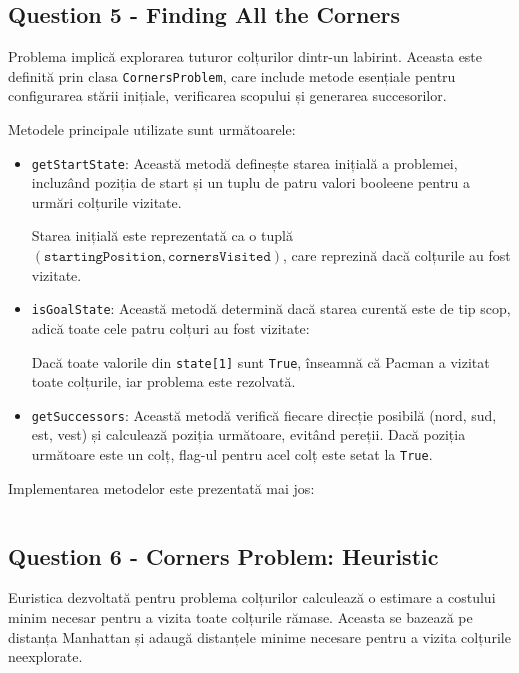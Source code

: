 \subsection{Question 5 - Finding All the Corners}
\par Problema implică explorarea tuturor colțurilor dintr-un labirint. Aceasta este definită prin clasa \texttt{CornersProblem}, care include metode esențiale pentru configurarea stării inițiale, verificarea scopului și generarea succesorilor.

\par Metodele principale utilizate sunt următoarele:

\begin{itemize}
	\item \texttt{getStartState}: Această metodă definește starea inițială a problemei, incluzând poziția de start și un tuplu de patru valori booleene pentru a urmări colțurile vizitate.
	\par Starea inițială este reprezentată ca o tuplă \((\texttt{startingPosition}, \texttt{cornersVisited})\), care reprezină dacă colțurile au fost vizitate.
	\item \texttt{isGoalState}: Această metodă determină dacă starea curentă este de tip scop, adică toate cele patru colțuri au fost vizitate:
	\par Dacă toate valorile din \texttt{state[1]} sunt \texttt{True}, înseamnă că Pacman a vizitat toate colțurile, iar problema este rezolvată.
	\item \texttt{getSuccessors}: Această metodă verifică fiecare direcție posibilă (nord, sud, est, vest) și calculează poziția următoare, evitând pereții. Dacă poziția următoare este un colț, flag-ul pentru acel colț este setat la \texttt{True}.
\end{itemize}

\par Implementarea metodelor este prezentată mai jos:
\inputminted[linenos]{python}{code/finding_all_corners.py}

\subsection{Question 6 - Corners Problem: Heuristic}
\par Euristica dezvoltată pentru problema colțurilor calculează o estimare a costului minim necesar pentru a vizita toate colțurile rămase. Aceasta se bazează pe distanța Manhattan și adaugă distanțele minime necesare pentru a vizita colțurile neexplorate.

